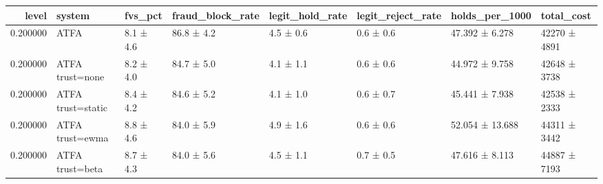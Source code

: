 \begin{tabular}{rlllllll}
\toprule
level & system & fvs\_pct & fraud\_block\_rate & legit\_hold\_rate & legit\_reject\_rate & holds\_per\_1000 & total\_cost \\
\midrule
0.200000 & ATFA & 8.1 ± 4.6 & 86.8 ± 4.2 & 4.5 ± 0.6 & 0.6 ± 0.6 & 47.392 ± 6.278 & 42270 ± 4891 \\
0.200000 & ATFA trust=none & 8.2 ± 4.0 & 84.7 ± 5.0 & 4.1 ± 1.1 & 0.6 ± 0.6 & 44.972 ± 9.758 & 42648 ± 3738 \\
0.200000 & ATFA trust=static & 8.4 ± 4.2 & 84.6 ± 5.2 & 4.1 ± 1.0 & 0.6 ± 0.7 & 45.441 ± 7.938 & 42538 ± 2333 \\
0.200000 & ATFA trust=ewma & 8.8 ± 4.6 & 84.0 ± 5.9 & 4.9 ± 1.6 & 0.6 ± 0.6 & 52.054 ± 13.688 & 44311 ± 3442 \\
0.200000 & ATFA trust=beta & 8.7 ± 4.3 & 84.0 ± 5.6 & 4.5 ± 1.1 & 0.7 ± 0.5 & 47.616 ± 8.113 & 44887 ± 7193 \\
\bottomrule
\end{tabular}
